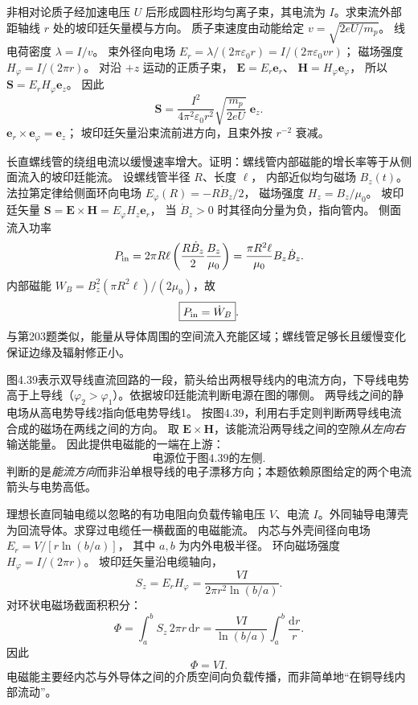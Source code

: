 非相对论质子经加速电压 $U$ 后形成圆柱形均匀离子束，其电流为 $I$。求束流外部距轴线 $r$ 处的坡印廷矢量模与方向。
\exsolution
质子束速度由动能给定
$v=\sqrt{2eU/m_p}$。
线电荷密度
$\lambda=I/v$。
束外径向电场
$E_r=\lambda/(2\pi\varepsilon_0r)
=I/(2\pi\varepsilon_0vr)$；
磁场强度
$H_\varphi=I/(2\pi r)$。
对沿 $+z$ 运动的正质子束，
$\bm E=E_r\bm e_r$、
$\bm H=H_\varphi\bm e_\varphi$，
所以
$\bm S=E_rH_\varphi\bm e_z$。
因此
\[
\boxed{\bm S=
\frac{I^2}{4\pi^2\varepsilon_0r^2}
\sqrt{\frac{m_p}{2eU}}\;\bm e_z}.
\]
\excheck $\bm e_r\times\bm e_\varphi=\bm e_z$；
坡印廷矢量沿束流前进方向，且束外按 $r^{-2}$ 衰减。

长直螺线管的绕组电流以缓慢速率增大。证明：螺线管内部磁能的增长率等于从侧面流入的坡印廷能流。
\exsolution
设螺线管半径 $R$、长度 $\ell$，
内部近似均匀磁场 $B_z(t)$。
法拉第定律给侧面环向电场
$E_\varphi(R)=-R\dot B_z/2$，
磁场强度
$H_z=B_z/\mu_0$。
坡印廷矢量
$\bm S=\bm E\times\bm H
=E_\varphi H_z\bm e_r$，
当 $\dot B_z>0$ 时其径向分量为负，指向管内。
侧面流入功率
\[
P_{\rm in}
=2\pi R\ell\left(\frac{R\dot B_z}{2}\frac{B_z}{\mu_0}\right)
=\frac{\pi R^2\ell}{\mu_0}B_z\dot B_z.
\]
内部磁能
$W_B=B_z^2(\pi R^2\ell)/(2\mu_0)$，故
\[
\boxed{P_{\rm in}=\dot W_B}.
\]
\excheck 与第203题类似，能量从导体周围的空间流入充能区域；螺线管足够长且缓慢变化保证边缘及辐射修正小。

图4.39表示双导线直流回路的一段，箭头给出两根导线内的电流方向，下导线电势高于上导线（$\varphi_2>\varphi_1$）。依据坡印廷能流判断电源在图的哪侧。
\exsolution
两导线之间的静电场从高电势导线2指向低电势导线1。
按图4.39，利用右手定则判断两导线电流合成的磁场在两线之间的方向。
取 $\bm E\times\bm H$，该能流沿两导线之间的空隙\emph{从左向右}输送能量。
因此提供电磁能的一端在上游：
\[
\boxed{\text{电源位于图4.39的左侧}}.
\]
\excheck 判断的是\emph{能流方向}而非沿单根导线的电子漂移方向；本题依赖原图给定的两个电流箭头与电势高低。

理想长直同轴电缆以忽略的有功电阻向负载传输电压 $V$、电流 $I$。外同轴导电薄壳为回流导体。求穿过电缆任一横截面的电磁能流。
\exsolution
内芯与外壳间径向电场
$E_r=V/[r\ln(b/a)]$，
其中 $a,b$ 为内外电极半径。
环向磁场强度
$H_\varphi=I/(2\pi r)$。
坡印廷矢量沿电缆轴向，
\[
S_z=E_rH_\varphi
=\frac{VI}{2\pi r^2\ln(b/a)}.
\]
对环状电磁场截面积积分：
\[
\Phi=\int_a^bS_z\,2\pi r\,\mathrm dr
=\frac{VI}{\ln(b/a)}\int_a^b\frac{\mathrm dr}{r}.
\]
因此
\[
\boxed{\Phi=VI}.
\]
\excheck 电磁能主要经内芯与外导体之间的介质空间向负载传播，而非简单地“在铜导线内部流动”。

